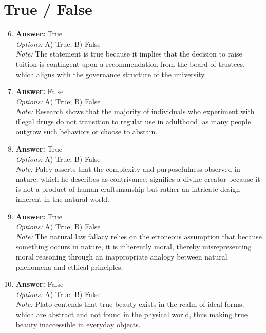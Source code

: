 \documentclass[12pt]{article}
\begin{document}
\section*{True / False}
\begin{enumerate}[label=\arabic*.]
\setcounter{enumi}{5}
\item \textbf{Answer:} True
\\ \textit{Options:} A) True; B) False
\\ \textit{Note:} The statement is true because it implies that the decision to raise tuition is contingent upon a recommendation from the board of trustees, which aligns with the governance structure of the university.
\item \textbf{Answer:} False
\\ \textit{Options:} A) True; B) False
\\ \textit{Note:} Research shows that the majority of individuals who experiment with illegal drugs do not transition to regular use in adulthood, as many people outgrow such behaviors or choose to abstain.
\item \textbf{Answer:} True
\\ \textit{Options:} A) True; B) False
\\ \textit{Note:} Paley asserts that the complexity and purposefulness observed in nature, which he describes as contrivance, signifies a divine creator because it is not a product of human craftsmanship but rather an intricate design inherent in the natural world.
\item \textbf{Answer:} True
\\ \textit{Options:} A) True; B) False
\\ \textit{Note:} The natural law fallacy relies on the erroneous assumption that because something occurs in nature, it is inherently moral, thereby misrepresenting moral reasoning through an inappropriate analogy between natural phenomena and ethical principles.
\item \textbf{Answer:} False
\\ \textit{Options:} A) True; B) False
\\ \textit{Note:} Plato contends that true beauty exists in the realm of ideal forms, which are abstract and not found in the physical world, thus making true beauty inaccessible in everyday objects.
\end{enumerate}
\end{document}
